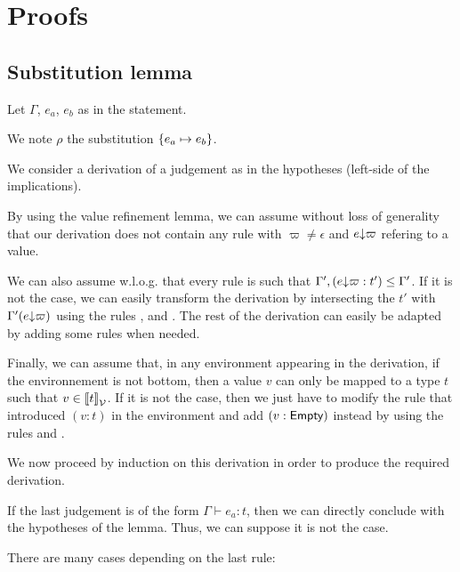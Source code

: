 \documentclass[a4paper]{article}
\theoremstyle{definition}
\begin{document}
        \section{Proofs}

        \subsection{Substitution lemma}

        Let $\Gamma$, $e_a$, $e_b$ as in the statement.

        We note $\rho$ the substitution $\{e_a \mapsto e_b\}$.

        We consider a derivation of a judgement as in the hypotheses (left-side of the implications).

        By using the value refinement lemma, we can assume without loss of generality that our derivation does not contain
        any rule  with $\varpi\neq\epsilon$ and $e{\downarrow}\varpi$ refering to a value.

        We can also assume w.l.o.g. that every  rule is such that $\Gamma',(e{\downarrow}\varpi:t') \leq \Gamma'$. If it is not the case,
        we can easily transform the derivation by intersecting the $t'$ with $\Gamma'(e{\downarrow}\varpi)$
        using the rules ,  and .
        The rest of the derivation can easily be adapted by adding some  rules when needed.

        Finally, we can assume that, in any environment appearing in the derivation, if the environnement is not bottom,
        then a value $v$ can only be mapped to a type $t$ such that $v\in{\llbracket t \rrbracket}_{\mathcal{V}}$. If it is not the case, then we just have to modify the
         rule that introduced $(v:t)$ in the environment and add $(v:\textsf{Empty})$ instead by using the rules  and .

        We now proceed by induction on this derivation in order to produce the required derivation.
        
        If the last judgement is of the form $\Gamma \vdash e_a: t$, then we can directly conclude with the hypotheses of the lemma.
        Thus, we can suppose it is not the case.

        There are many cases depending on the last rule:
\end{document}

